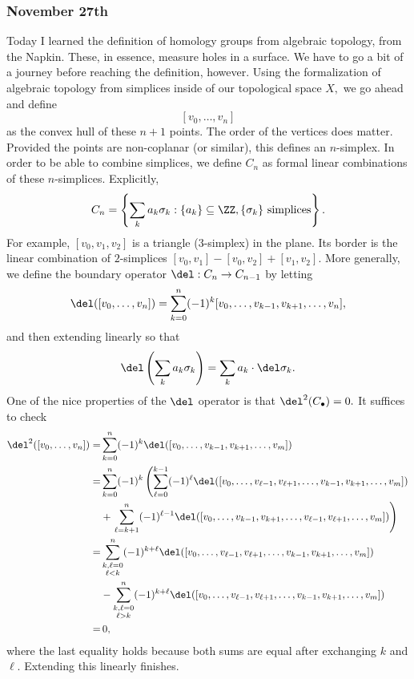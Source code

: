 \subsubsection{November 27th}
Today I learned the definition of homology groups from algebraic topology, from the Napkin. These, in essence, measure holes in a surface. We have to go a bit of a journey before reaching the definition, however. Using the formalization of algebraic topology from simplices inside of our topological space $X,$ we go ahead and define
\[[v_0,\ldots,v_n]\]
as the convex hull of these $n+1$ points. The order of the vertices does matter. Provided the points are non-coplanar (or similar), this defines an $n$-simplex. In order to be able to combine simplices, we define $C_n$ as formal linear combinations of these $n$-simplices. Explicitly,
\[C_n=\left\{\sum_ka_k\sigma_k:\{a_k\}\subseteq\ZZ,\{\sigma_k\}\text{ simplices}\right\}.\]
For example, $[v_0,v_1,v_2]$ is a triangle ($3$-simplex) in the plane. Its border is the linear combination of $2$-simplices $[v_0,v_1]-[v_0,v_2]+[v_1,v_2].$ More generally, we define the boundary operator $\del:C_n\to C_{n-1}$ by letting
\[\del([v_0,\ldots,v_n])=\sum_{k=0}^n(-1)^k[v_0,\ldots,v_{k-1},v_{k+1},\ldots,v_n],\]
and then extending linearly so that
\[\del\left(\sum_ka_k\sigma_k\right)=\sum_ka_k\cdot\del\sigma_k.\]
One of the nice properties of the $\del$ operator is that $\del^2(C_\bullet)=0.$ It suffices to check
\begin{align*}
    \del^2([v_0,\ldots,v_n]) =& \sum_{k=0}^n(-1)^k\del([v_0,\ldots,v_{k-1},v_{k+1},\ldots,v_m]) \\
    =& \sum_{k=0}^n(-1)^k\left(\sum_{\ell=0}^{k-1}(-1)^\ell\del([v_0,\ldots,v_{\ell-1},v_{\ell+1},\ldots,v_{k-1},v_{k+1},\ldots,v_m])\right. \\
    &+ \left.\sum_{\ell=k+1}^n(-1)^{\ell-1}\del([v_0,\ldots,v_{k-1},v_{k+1},\ldots,v_{\ell-1},v_{\ell+1},\ldots,v_m])\right) \\
    =& \sum_{\substack{k,\ell=0\\\ell<k}}^n(-1)^{k+\ell}\del([v_0,\ldots,v_{\ell-1},v_{\ell+1},\ldots,v_{k-1},v_{k+1},\ldots,v_m]) \\
    &- \sum_{\substack{k,\ell=0\\\ell>k}}^n(-1)^{k+\ell}\del([v_0,\ldots,v_{\ell-1},v_{\ell+1},\ldots,v_{k-1},v_{k+1},\ldots,v_m]) \\
    =&\, 0,
\end{align*}
where the last equality holds because both sums are equal after exchanging $k$ and $\ell.$ Extending this linearly finishes.

